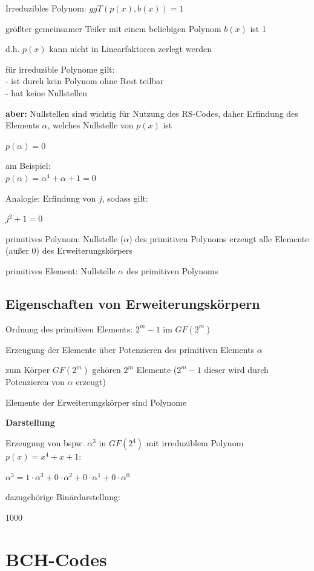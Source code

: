 Irreduzibles Polynom: $ggT(p(x), b(x)) = 1$

größter gemeinsamer Teiler mit einem beliebigen Polynom $b(x)$ ist 1

d.h. $p(x)$ kann nicht in Linearfaktoren zerlegt werden

für irreduzible Polynome gilt:\\
- ist durch kein Polynom ohne Rest teilbar\\
- hat keine Nullstellen

\textbf{aber:} Nullstellen sind wichtig für Nutzung des RS-Codes, daher \flqq Erfindung\flqq{} des
Elements $\alpha$, welches Nullstelle von $p(x)$ ist

$\displaystyle{
    p(\alpha) = 0
}$

am Beispiel:\\
$\displaystyle{
    p(\alpha) = \alpha^4 + \alpha + 1 = 0
}$

Analogie: \flqq Erfindung\flqq{} von $j$, sodass gilt:

$\displaystyle{
    j^2 + 1 = 0
}$

primitives Polynom: Nullstelle ($\alpha$) des primitiven Polynoms erzeugt alle Elemente (außer 0) des Erweiterungskörpers

primitives Element: Nullstelle $\alpha$ des primitiven Polynoms

\subsection{Eigenschaften von Erweiterungskörpern}

Ordnung des primitiven Elements: $2^m - 1$ im $GF(2^m)$

Erzeugung der Elemente über Potenzieren des primitiven Elements $\alpha$

zum Körper $GF(2^m)$ gehören $2^m$ Elemente ($2^m - 1$ dieser wird durch Potenzieren von $\alpha$ erzeugt)

Elemente der Erweiterungskörper sind Polynome

\textbf{Darstellung}

Erzeugung von bspw. $\alpha^3$ in $GF(2^4)$ mit irreduziblem Polynom $p(x) = x^4 + x + 1$:

$\displaystyle{
    \alpha^3 = 1 \cdot \alpha^3 + 0 \cdot \alpha^2 + 0 \cdot \alpha^1 + 0 \cdot \alpha^0
}$

dazugehörige Binärdarstellung:

$1000$

\section{BCH-Codes}

